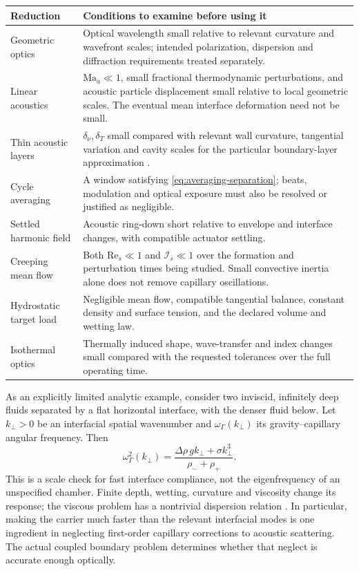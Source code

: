 \begin{longtable}{@{}>{\raggedright\arraybackslash}p{34mm}p{111mm}@{}}
\toprule Reduction & Conditions to examine before using it \\\midrule\endhead
Geometric optics & Optical wavelength small relative to relevant curvature
and wavefront scales; intended polarization, dispersion and diffraction
requirements treated separately.\\
Linear acoustics & $\mathrm{Ma}_a\ll1$, small fractional thermodynamic
perturbations, and acoustic particle displacement small relative to local
geometric scales. The eventual mean interface deformation need not be small.\\
Thin acoustic layers & $\delta_\nu,\delta_T$ small compared with relevant wall
curvature, tangential variation and cavity scales for the particular
boundary-layer approximation \cite{bach2018,jorgensen2021}.\\
Cycle averaging & A window satisfying \cref{eq:averaging-separation}; beats,
modulation and optical exposure must also be resolved or justified as negligible.\\
Settled harmonic field & Acoustic ring-down short relative to envelope and
interface changes, with compatible actuator settling.\\
Creeping mean flow & Both $\mathrm{Re}_s\ll1$ and $\mathcal I_s\ll1$ over the
formation and perturbation times being studied. Small convective inertia
alone does not remove capillary oscillations.\\
Hydrostatic target load & Negligible mean flow, compatible tangential balance,
constant density and surface tension, and the declared volume and wetting law.\\
Isothermal optics & Thermally induced shape, wave-transfer and index changes
small compared with the requested tolerances over the full operating time.\\
\bottomrule
\end{longtable}

As an explicitly limited analytic example, consider two inviscid, infinitely
deep fluids separated by a flat horizontal interface, with the denser fluid
below. Let $k_\perp>0$ be an interfacial spatial wavenumber and
$\omega_\Gamma(k_\perp)$ its gravity--capillary angular frequency. Then
\begin{equation}
 \omega_\Gamma^2(k_\perp)
   =\frac{\Delta\rho\,gk_\perp+\sigma k_\perp^3}{\rho_-+\rho_+}.
 \label{eq:inviscid-capillary-limit}
\end{equation}
This is a scale check for fast interface compliance, not the eigenfrequency
of an unspecified chamber. Finite depth, wetting, curvature and viscosity
change its response; the viscous problem has a nontrivial dispersion relation
\cite{denner2016}. In particular, making the carrier much faster than the
relevant interfacial modes is one ingredient in neglecting first-order
capillary corrections to acoustic scattering. The actual coupled boundary
problem determines whether that neglect is accurate enough optically.

